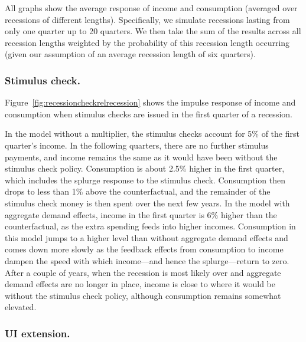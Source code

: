 \documentclass{econsocart}
\begin{document}
All graphs show the average response of income and consumption (averaged over recessions of different lengths).
Specifically, we simulate recessions lasting from only one quarter up to 20 quarters.
We then take the sum of the results across all recession lengths weighted by the probability of this recession length occurring (given our assumption of an average recession length of six quarters).

\subsubsection{Stimulus check.}

Figure~\ref{fig:recessioncheckrelrecession} shows the impulse response of income and consumption when stimulus checks are issued in the first quarter of a recession.


In the model without a multiplier, the stimulus checks account for 5\% of the first quarter's income.
In the following quarters, there are no further stimulus payments, and income remains the same as it would have been without the stimulus check policy.
Consumption is about 2.5\% higher in the first quarter, which includes the splurge response to the stimulus check.
Consumption then drops to less than 1\% above the counterfactual, and the remainder of the stimulus check money is then spent over the next few years.
In the model with aggregate demand effects, income in the first quarter is 6\% higher than the counterfactual, as the extra spending feeds into higher incomes.
Consumption in this model jumps to a higher level than without aggregate demand effects and comes down more slowly as the feedback effects from consumption to income dampen the speed with which income---and hence the splurge---return to zero.
After a couple of years, when the recession is most likely over and aggregate demand effects are no longer in place, income is close to where it would be without the stimulus check policy, although consumption remains somewhat elevated.

\subsubsection{UI extension.}
\end{document}
